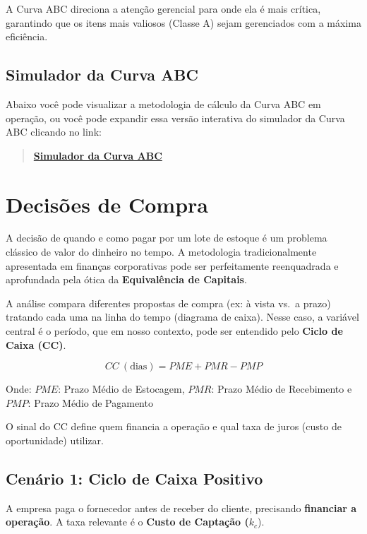 \documentclass[
  a4paper,
]{book}
\begin{document}
A Curva ABC direciona a atenção gerencial para onde ela é mais crítica,
garantindo que os itens mais valiosos (Classe A) sejam gerenciados com a
máxima eficiência.

\subsection{Simulador da Curva ABC}\label{simulador-da-curva-abc}

Abaixo você pode visualizar a metodologia de cálculo da Curva ABC em
operação, ou você pode expandir essa versão interativa do simulador da
Curva ABC clicando no link:

\begin{quote}
\href{resources/05-curvaABC.html}{\textbf{Simulador da Curva ABC}}
\end{quote}

\section{Decisões de Compra}\label{decisuxf5es-de-compra}

A decisão de quando e como pagar por um lote de estoque é um problema
clássico de valor do dinheiro no tempo. A metodologia tradicionalmente
apresentada em finanças corporativas pode ser perfeitamente reenquadrada
e aprofundada pela ótica da \textbf{Equivalência de Capitais}.

A análise compara diferentes propostas de compra (ex: à vista vs.~a
prazo) tratando cada uma na linha do tempo (diagrama de caixa). Nesse
caso, a variável central é o período, que em nosso contexto, pode ser
entendido pelo \textbf{Ciclo de Caixa (CC)}.

\[
CC~(\text{dias}) = PME + PMR - PMP
\]

Onde: \(PME\): Prazo Médio de Estocagem, \(PMR\): Prazo Médio de
Recebimento e \(PMP\): Prazo Médio de Pagamento

O sinal do CC define quem financia a operação e qual taxa de juros
(custo de oportunidade) utilizar.

\subsection{Cenário 1: Ciclo de Caixa
Positivo}\label{cenuxe1rio-1-ciclo-de-caixa-positivo}

A empresa paga o fornecedor antes de receber do cliente, precisando
\textbf{financiar a operação}. A taxa relevante é o \textbf{Custo de
Captação (}\(k_c\)).
\end{document}
